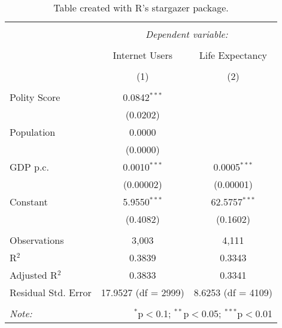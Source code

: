
\begin{table}[!htbp] \centering 
  \caption{Table created with R's stargazer package.} 
  \label{tabfancy} 
\scriptsize 
\begin{tabular}{@{\extracolsep{0pt}}lcc} 
\\[-1.8ex]\hline 
\hline \\[-1.8ex] 
 & \multicolumn{2}{c}{\textit{Dependent variable:}} \\ 
\cline{2-3} 
\\[-1.8ex] & Internet Users & Life Expectancy \\ 
\\[-1.8ex] & (1) & (2)\\ 
\hline \\[-1.8ex] 
 Polity Score & 0.0842$^{***}$ &  \\ 
  & (0.0202) &  \\ 
  Population & 0.0000 &  \\ 
  & (0.0000) &  \\ 
  GDP p.c. & 0.0010$^{***}$ & 0.0005$^{***}$ \\ 
  & (0.00002) & (0.00001) \\ 
  Constant & 5.9550$^{***}$ & 62.5757$^{***}$ \\ 
  & (0.4082) & (0.1602) \\ 
 \hline \\[-1.8ex] 
Observations & 3,003 & 4,111 \\ 
R$^{2}$ & 0.3839 & 0.3343 \\ 
Adjusted R$^{2}$ & 0.3833 & 0.3341 \\ 
Residual Std. Error & 17.9527 (df = 2999) & 8.6253 (df = 4109) \\ 
\hline 
\hline \\[-1.8ex] 
\textit{Note:}  & \multicolumn{2}{r}{$^{*}$p$<$0.1; $^{**}$p$<$0.05; $^{***}$p$<$0.01} \\ 
\end{tabular} 
\end{table} 
